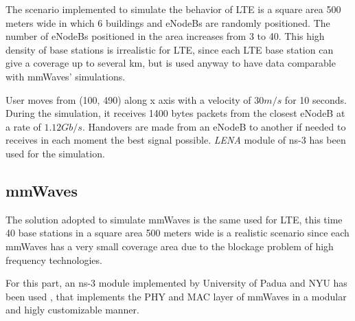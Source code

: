The scenario implemented to simulate the behavior of LTE is a square area 500 meters wide in which 6 buildings and eNodeBs are randomly positioned.
The number of eNodeBs positioned in the area increases from 3 to 40. This high density of base stations is irrealistic for LTE, since each LTE base station can give a coverage up to several km, but is used anyway to have data comparable with \gls{mmWaves}' simulations.

User moves from (100, 490) along x axis with a velocity of $30m/s$ for 10 seconds. During the simulation, it receives 1400 bytes packets from the closest eNodeB at a rate of $1.12 Gb/s$. Handovers are made from an eNodeB to another if needed to receives in each moment the best signal possible. \textit{LENA} module of ns-3 has been used for the simulation.


\subsection{mmWaves}
The solution adopted to simulate \gls{mmWaves} is the same used for LTE, this time 40 base stations in a square area 500 meters wide is a realistic scenario since each mmWaves has a very small coverage area due to the blockage problem of high frequency technologies.

For this part, an ns-3 module implemented by University of Padua and NYU has been used \cite{Mezzavilla18}, that implements the PHY and MAC layer of mmWaves in a modular and higly customizable manner.